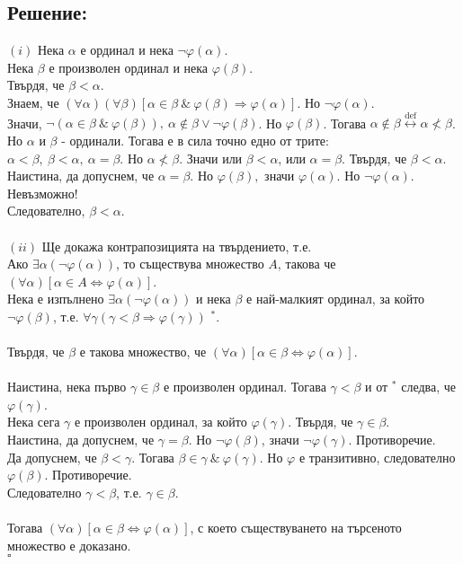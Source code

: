 \documentclass[french]{article}
\begin{document}
	\subsection*{Решение:}
	$(i)$ Нека $\alpha$ е ординал и нека $\neg \varphi(\alpha)$. \\
	Нека $\beta$ е произволен ординал и нека $\varphi(\beta)$. \\
	Твърдя, че $\beta < \alpha$. \\
	Знаем, че $(\forall \alpha)(\forall \beta)[\alpha \in \beta\ \&\ \varphi(\beta) \Rightarrow \varphi(\alpha)].$ Но $\neg \varphi(\alpha)$. \\
	Значи, $\neg (\alpha \in \beta\ \&\ \varphi(\beta)),\ \alpha \notin \beta \vee \neg \varphi(\beta)$. Но $\varphi(\beta)$. Тогава $\alpha \notin \beta \stackrel{\mathrm{def}}{\longleftrightarrow} \alpha \not< \beta$. \\
	Но $\alpha$ и $\beta$ - ординали. Тогава е в сила точно едно от трите: \\
	$\alpha < \beta,\ \beta < \alpha,\ \alpha = \beta$. Но $\alpha \not< \beta$. Значи или $\beta < \alpha$, или $\alpha = \beta$. Твърдя, че $\beta < \alpha$. \\
	Наистина, да допуснем, че $\alpha = \beta$. Но $\varphi(\beta),$ значи $\varphi(\alpha)$. Но $\neg\varphi(\alpha)$. \\ 
	Невъзможно! \\
	Следователно, $\beta < \alpha$. \\
	\\
	$(ii)$ Ще докажа контрапозицията на твърдението, т.е. \\
	Ако $\exists \alpha (\neg \varphi(\alpha))$, то съществува множество $A$, такова че $(\forall \alpha)[\alpha \in A \Longleftrightarrow \varphi(\alpha)]$. \\
	Нека е изпълнено $\exists \alpha (\neg \varphi(\alpha))$ и нека $\beta$ е най-малкият ординал, за който $\neg \varphi(\beta)$, т.е. $\forall \gamma (\gamma < \beta \Rightarrow \varphi(\gamma))$ $^*$. \\
	\\
	Твърдя, че $\beta$ е такова множество, че $(\forall \alpha)[\alpha \in \beta \Longleftrightarrow \varphi(\alpha)]$. \\
	\\
	Наистина, нека първо $\gamma \in \beta$ е произволен ординал. Тогава $\gamma < \beta$ и от $^*$ следва, че $\varphi(\gamma)$. \\
	Нека сега $\gamma$ е произволен ординал, за който $\varphi(\gamma)$. Твърдя, че $\gamma \in \beta$. \\
	Наистина, да допуснем, че $\gamma = \beta$. Но $\neg \varphi(\beta)$, значи $\neg \varphi(\gamma)$. Противоречие. \\
	Да допуснем, че $\beta < \gamma$. Тогава $\beta \in \gamma\ \&\ \varphi(\gamma)$. Но $\varphi$ е транзитивно, следователно $\varphi(\beta)$. Противоречие. \\
	Следователно $\gamma < \beta$, т.е. $\gamma \in \beta$. \\
	\\	
	Тогава $(\forall \alpha)[\alpha \in \beta \Longleftrightarrow \varphi(\alpha)]$, с което съществуването на търсеното множество е доказано. \\
	$\square$
	
\end{document}
